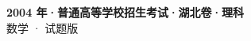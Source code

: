 \documentclass[zihao=-4, a4paper]{ctexart}
\begin{document}
\begin{center}
  {\Large\bfseries 2004 年·普通高等学校招生考试·湖北卷·理科}\\[4pt]
  {\large 数学 · 试题版}
\end{center}
\medskip
{}

\end{document}
